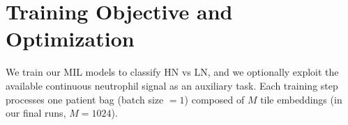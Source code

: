 \section{Training Objective and Optimization}
\label{sec:training}

We train our MIL models to classify HN vs LN, and we optionally exploit the available continuous neutrophil signal as an auxiliary task. Each training step processes one patient bag (batch size $=1$) composed of $M$ tile embeddings (in our final runs, $M=1024$).

